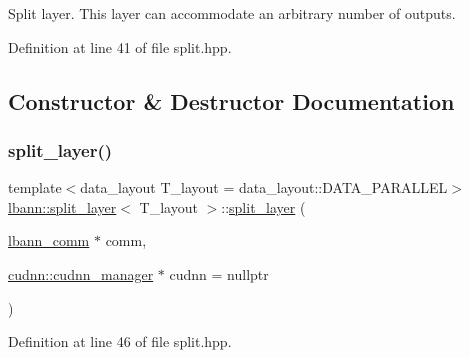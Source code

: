 Split layer. This layer can accommodate an arbitrary number of outputs. 

Definition at line 41 of file split.\+hpp.



\subsection{Constructor \& Destructor Documentation}
\mbox{\label{classlbann_1_1split__layer_a875f1e07dd924826e7ec62e44f697c3e}} 
\subsubsection{\texorpdfstring{split\+\_\+layer()}{split\_layer()}}
{\footnotesize\ttfamily template$<$data\+\_\+layout T\+\_\+layout = data\+\_\+layout\+::\+D\+A\+T\+A\+\_\+\+P\+A\+R\+A\+L\+L\+EL$>$ \\
\hyperlink{classlbann_1_1split__layer}{lbann\+::split\+\_\+layer}$<$ T\+\_\+layout $>$\+::\hyperlink{classlbann_1_1split__layer}{split\+\_\+layer} (\begin{DoxyParamCaption}\item[{\hyperlink{classlbann_1_1lbann__comm}{lbann\+\_\+comm} $\ast$}]{comm,  }\item[{\hyperlink{classlbann_1_1cudnn_1_1cudnn__manager}{cudnn\+::cudnn\+\_\+manager} $\ast$}]{cudnn = {\ttfamily nullptr} }\end{DoxyParamCaption})\hspace{0.3cm}{\ttfamily [inline]}}



Definition at line 46 of file split.\+hpp.


